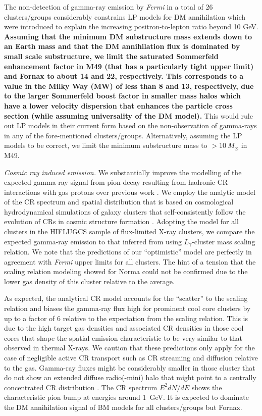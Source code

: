 \documentclass[10pt,aps,pra,reprint,amsmath,amsfonts,amssymb,showpacs,nofootinbib,floatfix]{revtex4-1}
\def\C#1{{\bf #1}}
\newcommand{\Fermi}{{\em Fermi}\xspace}
\newcommand{\msun}{M_\odot}
\begin{document}
The non-detection of gamma-ray emission by \Fermi in a total of 26
clusters/groups considerably constrains LP models for DM annihilation
which were introduced to explain the increasing positron-to-lepton
ratio beyond 10 GeV. \C{Assuming that the minimum DM substructure mass
  extends down to an Earth mass and that the DM annihilation flux is
  dominated by small scale substructure, we limit the saturated
  Sommerfeld enhancement factor in M49 (that has a particularly tight
  upper limit) and Fornax to about 14 and 22, respectively. This
  corresponds to a value in the Milky Way (MW) of less than 8 and 13,
  respectively, due to the larger Sommerfeld boost factor in smaller
  mass halos which have a lower velocity dispersion that enhances the
  particle cross section (while assuming universality of the DM
  model).} This would rule out LP models in their current form based
on the non-observation of gamma-rays in any of the fore-mentioned
clusters/groups. Alternatively, assuming the LP models to be correct,
we limit the minimum substructure mass to $>10~\msun$ in M49.


{\em Cosmic ray induced emission.} We substantially improve the
modelling of the expected gamma-ray signal from pion-decay resulting
from hadronic CR interactions with gas protons over previous work
\citep{2010ApJ...717L..71A}. We employ the analytic model of the CR
spectrum and spatial distribution that is based on cosmological
hydrodynamical simulations of galaxy clusters that self-consistently
follow the evolution of CRs in cosmic structure formation
\citet{2010MNRAS.409..449P}. Adopting the model for all clusters in
the HIFLUGCS sample of flux-limited X-ray clusters, we compare the
expected gamma-ray emission to that inferred from using
$L_\gamma$-cluster mass scaling relation. We note that the predictions
of our ``optimistic'' model are perfectly in agreement with \Fermi
upper limits for all clusters.  The hint of a tension that the scaling
relation modeling showed for Norma \citep{2010ApJ...717L..71A} could
not be confirmed due to the lower gas density of this cluster relative
to the average.  

As expected, the analytical CR model accounts for the ``scatter'' to
the scaling relation and biases the gamma-ray flux high for prominent
cool core clusters by up to a factor of 6 relative to the expectation
from the scaling relation. This is due to the high target gas
densities and associated CR densities in those cool cores that shape
the spatial emission characteristic to be very similar to that
observed in thermal X-rays. We caution that these predictions only
apply for the case of negligible active CR transport such as CR
streaming and diffusion relative to the gas. Gamma-ray fluxes might be
considerably smaller in those cluster that do not show an extended
diffuse radio(-mini) halo that might point to a centrally concentrated
CR distribution \citep{2011A&A...527A..99E}. The CR spectrum $E^2
dN/dE$ shows the characteristic pion bump at energies around 1~GeV. It
is expected to dominate the DM annihilation signal of BM models for
all clusters/groups but Fornax.
\end{document}
